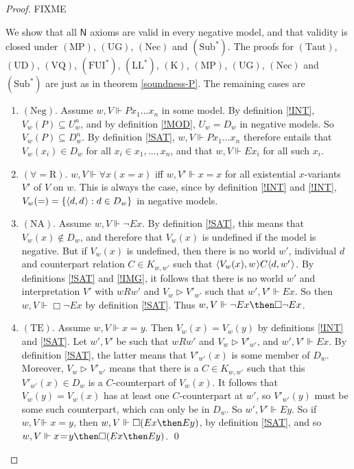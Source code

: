 \documentclass[11pt]{woarticle}
\theoremstyle{break}
\theoremstyle{nonumberplain}
\newcommand{\s}[1]{\ensuremath{\mathsf{#1}}}
\newcommand{\SAT}{\Vdash}
\newcommand{\Img}{\triangleright}
\newcommand{\1}{\;\,|\;\,}
\renewcommand{\t}[1]{\ensuremath{\langle #1  \makebox[.2ex]{}\rangle}}
\newcommand{\T}[1]{\ensuremath{(\mathrm{ #1})}}
\begin{document}
\begin{proof}
  FIXME
  
  We show that all \s{N} axioms are valid in every negative model, and
  that validity is closed under \T{MP}, \T{UG}, \T{Nec} and \T{Sub^*}.
  The proofs for \T{Taut}, \T{UD}, \T{VQ}, \T{FUI^*}, \T{LL^*}, \T{K},
  \T{MP}, \T{UG}, \T{Nec} and \T{Sub^*} are just as in theorem
  \ref{soundness-P}. The remaining cases are

  \begin{enumerate}

  \item \T{Neg}.\; Assume $w,V \SAT Px_1\ldots x_n$ in some model. By
    definition \ref{!INT}, $V_w(P) \subseteq U_w^n$, and by definition
    \ref{!MOD}, $U_w = D_w$ in negative models. So $V_w(P) \subseteq
    D_w^n$. By definition \ref{!SAT}, $w,V \SAT Px_1\ldots x_n$
    therefore entails that $V_w(x_i) \in D_w$ for all $x_i \in
    x_1,\ldots,x_n$, and that $w,V \SAT Ex_i$ for all such $x_i$.

  \item \T{\forall\!=\!R}.\; $w,V \SAT \forall x(x\!=\!x)$ iff $w,V' \SAT
    x\!=\!x$ for all existential $x$-variants $V'$ of $V$ on $w$. This
    is always the case, since by definition \ref{!INT} and
    \ref{!INT}, $V_w(=) = \{ \t{d,d} : d \in D_w \}$ in negative
    models.

  \item \T{NA}.\; Assume $w,V \SAT \neg Ex$. By definition \ref{!SAT},
    this means that $V_w(x) \not\in D_w$, and therefore that $V_w(x)$
    is undefined if the model is negative. But if $V_w(x)$ is
    undefined, then there is no world $w'$, individual $d$ and
    counterpart relation $C\in K_{w,w'}$ such that
    $\t{V_w(x),w}C\t{d,w'}$. By definitions \ref{!SAT} and \ref{!IMG},
    it follows that there is no world $w'$ and interpretation $V'$
    with $wRw'$ and $V_w \Img V'_{w'}$ such that $w',V' \SAT Ex$. So
    then $w,V \SAT \Box \neg Ex$ by definition \ref{!SAT}. Thus $w,V
    \SAT \neg Ex \then \Box \neg Ex$.

  \item \T{TE}.\; Assume $w,V \SAT x\!=\!y$. Then $V_w(x) = V_w(y)$ by
    definitions \ref{!INT} and \ref{!SAT}. Let $w',V'$ be such that
    $wRw'$ and $V_w \Img V'_{w'}$, and $w',V' \SAT Ex$. By definition
    \ref{!SAT}, the latter means that $V'_{w'}(x)$ is some member of
    $D_w$. Moreover, $V_w \Img V'_{w'}$ means that there is a $C\in
    K_{w,w'}$ such that this $V'_{w'}(x) \in D_w$ is a $C$-counterpart
    of $V_w(x)$. It follows that $V_w(y) = V_w(x)$ has at least one
    $C$-counterpart at $w'$, so $V'_{w'}(y)$ must be some such
    counterpart, which can only be in $D_w$. So $w',V' \SAT Ey$.  So
    if $w,V \SAT x\!=\!y$, then $w,V \SAT \Box (Ex \then Ey)$, by
    definition \ref{!SAT}, and so $w,V \SAT x\!=\!y \then \Box (Ex
    \then Ey)$. \qed


  \end{enumerate}

\end{proof}
\end{document}
